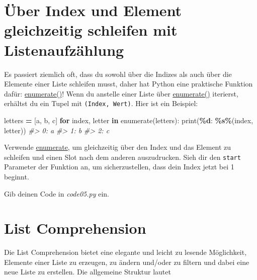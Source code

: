 \documentclass[
]{book}
\newenvironment{Shaded}{\begin{snugshade}}{\end{snugshade}}
\newcommand{\BuiltInTok}[1]{#1}
\newcommand{\CommentTok}[1]{\textcolor[rgb]{0.56,0.35,0.01}{\textit{#1}}}
\newcommand{\ControlFlowTok}[1]{\textcolor[rgb]{0.13,0.29,0.53}{\textbf{#1}}}
\newcommand{\KeywordTok}[1]{\textcolor[rgb]{0.13,0.29,0.53}{\textbf{#1}}}
\newcommand{\NormalTok}[1]{#1}
\newcommand{\OperatorTok}[1]{\textcolor[rgb]{0.81,0.36,0.00}{\textbf{#1}}}
\newcommand{\SpecialCharTok}[1]{\textcolor[rgb]{0.81,0.36,0.00}{\textbf{#1}}}
\newcommand{\StringTok}[1]{\textcolor[rgb]{0.31,0.60,0.02}{#1}}
\begin{document}
\hypertarget{enumerate}{%
\section{Über Index und Element gleichzeitig schleifen mit Listenaufzählung}\label{enumerate}}

Es passiert ziemlich oft, dass du sowohl über die Indizes als auch über die Elemente einer Liste schleifen musst, daher hat Python eine praktische Funktion dafür: \href{https://docs.python.org/3/library/functions.html\#enumerate}{enumerate()}! Wenn du anstelle einer Liste über \href{https://docs.python.org/3/library/functions.html\#enumerate}{enumerate()} iterierst, erhältst du ein Tupel mit \texttt{(Index,\ Wert)}. Hier ist ein Beispiel:

\begin{Shaded}
\begin{Highlighting}[]
\NormalTok{letters }\OperatorTok{=}\NormalTok{ [}\StringTok{\textquotesingle{}a\textquotesingle{}}\NormalTok{, }\StringTok{\textquotesingle{}b\textquotesingle{}}\NormalTok{, }\StringTok{\textquotesingle{}c\textquotesingle{}}\NormalTok{]}
\ControlFlowTok{for}\NormalTok{ index, letter }\KeywordTok{in} \BuiltInTok{enumerate}\NormalTok{(letters):}
    \BuiltInTok{print}\NormalTok{(}\StringTok{\textquotesingle{}}\SpecialCharTok{\%d}\StringTok{: }\SpecialCharTok{\%s}\StringTok{\textquotesingle{}}\OperatorTok{\%}\NormalTok{(index, letter))}
\CommentTok{\#\textgreater{} 0: a}
\CommentTok{\#\textgreater{} 1: b}
\CommentTok{\#\textgreater{} 2: c}
\end{Highlighting}
\end{Shaded}

Verwende \href{https://docs.python.org/3/library/functions.html\#enumerate}{enumerate}, um gleichzeitig über den Index und das Element zu schleifen und einen Slot nach dem anderen auszudrucken. Sieh dir den \texttt{start} Parameter der Funktion an, um sicherzustellen, dass dein Index jetzt bei 1 beginnt.

Gib deinen Code in \emph{code05.py} ein.

\hypertarget{list-comprehension}{%
\section{List Comprehension}\label{list-comprehension}}

Die List Comprehension bietet eine elegante und leicht zu lesende Möglichkeit, Elemente einer Liste zu erzeugen, zu ändern und/oder zu filtern und dabei eine neue Liste zu erstellen. Die allgemeine Struktur lautet
\end{document}
